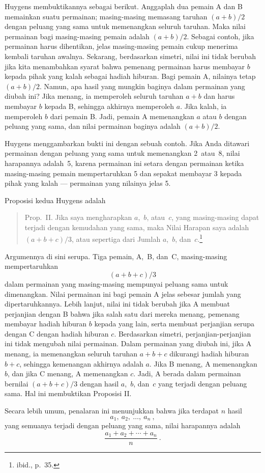 Huygens membuktikannya sebagai berikut. Anggaplah dua pemain A dan B memainkan suatu
permainan; masing-masing memasang taruhan $(a + b)/2$ dengan peluang yang sama untuk
memenangkan seluruh taruhan. Maka nilai permainan bagi masing-masing pemain adalah
$(a + b)/2$. Sebagai contoh, jika permainan harus dihentikan, jelas masing-masing
pemain cukup menerima kembali taruhan awalnya. Sekarang, berdasarkan simetri, nilai
ini tidak berubah jika kita menambahkan syarat bahwa pemenang permainan harus membayar
$b$ kepada pihak yang kalah sebagai hadiah hiburan. Bagi pemain A, nilainya tetap
$(a + b)/2$. Namun, apa hasil yang mungkin baginya dalam permainan yang diubah ini?
Jika menang, ia memperoleh seluruh taruhan $a + b$ dan harus membayar $b$ kepada B,
sehingga akhirnya memperoleh $a$. Jika kalah, ia memperoleh $b$ dari pemain B. Jadi,
pemain A memenangkan $a$ atau $b$ dengan peluang yang sama, dan nilai permainan
baginya adalah $(a + b)/2$.

Huygens menggambarkan bukti ini dengan sebuah contoh. Jika Anda ditawari permainan
dengan peluang yang sama untuk memenangkan 2~atau~8, nilai harapannya adalah~5, karena
permainan ini setara dengan permainan ketika masing-masing pemain mempertaruhkan 5 dan
sepakat membayar 3 kepada pihak yang kalah --- permainan yang nilainya jelas 5.

Proposisi kedua Huygens adalah

\begin{quote} Prop.~II. Jika saya mengharapkan $a$,~$b$, atau~$c$, yang masing-masing
dapat terjadi dengan kemudahan yang sama, maka Nilai Harapan saya adalah
$(a + b + c)/3$, atau sepertiga dari Jumlah $a$,~$b$, dan~$c$.\footnote{ibid.,
p.~35.}
\end{quote}

Argumennya di sini serupa. Tiga pemain, A,~B, dan~C, masing-masing mempertaruhkan
$$(a+b+c)/3$$ 
dalam permainan yang masing-masing mempunyai peluang sama untuk dimenangkan. Nilai
permainan ini bagi pemain A jelas sebesar jumlah yang dipertaruhkannya. Lebih lanjut,
nilai ini tidak berubah jika A membuat perjanjian dengan B bahwa jika salah satu dari
mereka menang, pemenang membayar hadiah hiburan $b$ kepada yang lain, serta membuat
perjanjian serupa dengan C dengan hadiah hiburan $c$. Berdasarkan simetri,
perjanjian-perjanjian ini tidak mengubah nilai permainan. Dalam permainan yang diubah
ini, jika A menang, ia memenangkan seluruh taruhan $a + b + c$ dikurangi hadiah
hiburan $b + c$, sehingga kemenangan akhirnya adalah $a$. Jika B menang, A
memenangkan $b$, dan jika C menang, A memenangkan $c$. Jadi, A berada dalam permainan
bernilai $(a + b + c)/3$ dengan hasil $a$,~$b$, dan~$c$ yang terjadi dengan peluang
sama. Hal ini membuktikan Proposisi II.
\par
Secara lebih umum, penalaran ini menunjukkan bahwa jika terdapat $n$ hasil
$$a_1,\ a_2,\ \ldots,\ a_n\ ,$$ 
yang semuanya terjadi dengan peluang yang sama, nilai harapannya adalah
$$
\frac {a_1 + a_2 +\cdots+ a_n}n\ .
$$

